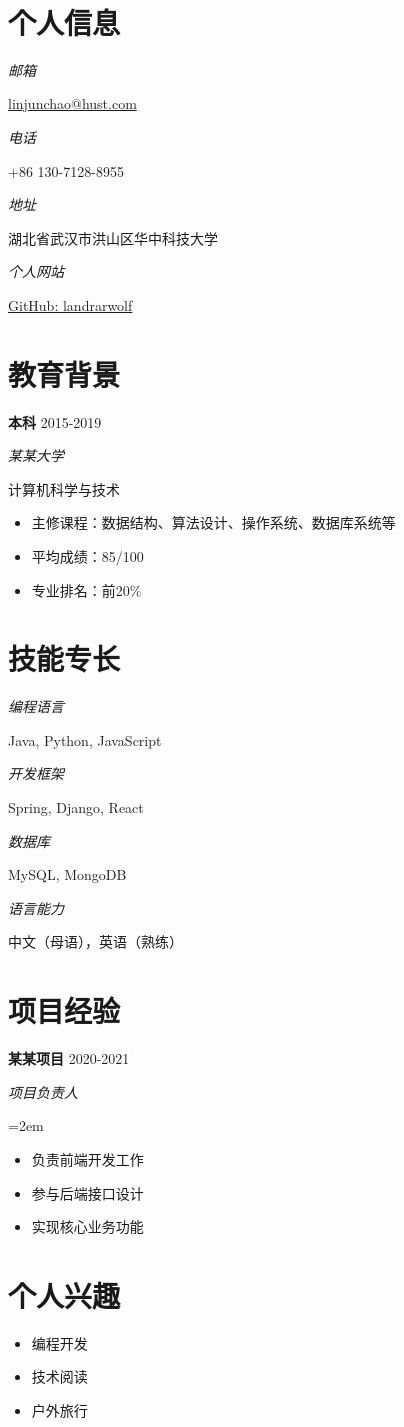 \documentclass[fontsize=11pt]{scrartcl} %
\newlength{\spacebox}
\newcommand{\sepspace}{\vspace*{1em}}		%
\newcommand{\MyName}[1]{ %
\centering{\Huge #1}}
\newcommand{\MySlogan}[1]{ %
\centering{#1}}
\newcommand{\NewPart}[2]{\section*{\uppercase{#1} #2}}
\newcommand{\PersonalEntry}[2]{
		\noindent 
		\flushleft
		\parbox{\spacebox}{        %
		\textit{#1}}		       %
		\hspace{1.5em} #2 \par}    %
\newcommand{\SkillsEntry}[2]{      %
		\noindent 
		\flushleft
		\parbox{\spacebox}{        %
		\textit{#1}}			   %
		\hspace{1.5em} #2 \par}    %
\newcommand{\EducationEntry}[4]{
		\noindent \textbf{#1} \hfill      %
		\colorbox{White}{\color{Black}#2} \par  %
		\noindent \textit{#3} \par        %
		\noindent #4 \par}
\newcommand{\WorkEntry}[4]{				  %
		\noindent \textbf{#1} \hfill      %
		\colorbox{White}{\color{Black}#2} \par  %
		\noindent \textit{#3} \par              %
		\noindent\hangindent=2em\hangafter=0 \small #4 %
		\normalsize \par}
\begin{document}
%
% 



\MyName{\textbf{\textsf{林筠超}}}
\\
\MySlogan{个人简历}

\sepspace

\NewPart{个人信息}{}

\PersonalEntry{邮箱}{\href{mailto:linjunchao@hust.com}{linjunchao@hust.com}}
\PersonalEntry{电话}{+86 130-7128-8955}
\PersonalEntry{地址}{湖北省武汉市洪山区华中科技大学}
\PersonalEntry{个人网站}{\href{https://github.com/landrarwolf}{GitHub: landrarwolf}}

\NewPart{教育背景}{}
\sepspace

\EducationEntry{本科}{2015-2019}{某某大学}{计算机科学与技术}{
    \begin{itemize}
        \item 主修课程：数据结构、算法设计、操作系统、数据库系统等
        \item 平均成绩：85/100
        \item 专业排名：前20\%
    \end{itemize}
}

\NewPart{技能专长}{}
\sepspace

\SkillsEntry{编程语言}{Java, Python, JavaScript}
\SkillsEntry{开发框架}{Spring, Django, React}
\SkillsEntry{数据库}{MySQL, MongoDB}
\SkillsEntry{语言能力}{中文（母语），英语（熟练）}

\NewPart{项目经验}{}
\sepspace

\WorkEntry{某某项目}{2020-2021}{项目负责人}{
    \begin{itemize}
        \item 负责前端开发工作
        \item 参与后端接口设计
        \item 实现核心业务功能
    \end{itemize}
}

\NewPart{个人兴趣}{}
\begin{itemize}
    \item 编程开发
    \item 技术阅读
    \item 户外旅行
\end{itemize}
\end{document}
